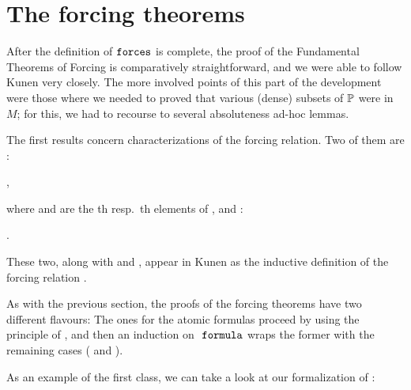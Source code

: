 \section{The forcing theorems}
\label{sec:forcing-theorems}

After the definition of $\mathop{\mathtt{forces}}$ is complete, the proof of the
Fundamental Theorems of Forcing is comparatively straightforward, and
we were able to follow Kunen very closely. The more involved points of
this part of the development were those where we needed to proved that
various (dense) subsets of $\mathbb{P}$ were in $M$; for this, we had to
recourse to several absoluteness ad-hoc lemmas.

The first results concern characterizations of the forcing
relation. Two of them are :
\begin{center}
  ,
\end{center}
where  and  are the
th resp.\ th elements of , and  :
\begin{center}
  .
\end{center}
These two, along with   and
, appear in Kunen as the
inductive definition of the forcing relation \cite[Def.~IV.2.42]{kunen2011set}.

As with the previous section, the proofs of the forcing theorems have two different
flavours: The ones for the atomic formulas proceed by using the
principle of 
, and then an induction on
$\formula$ wraps the former with the remaining cases ( and ). 

As an example of the first class, we can take a look at our
formalization of \cite[Lem.~IV.2.40(a)]{kunen2011set}:

